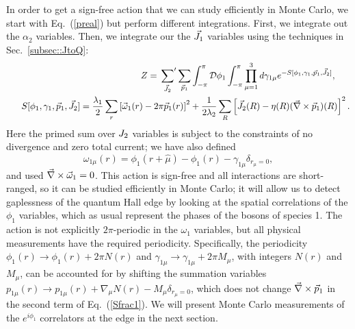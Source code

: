 In order to get a sign-free action that we can study efficiently in Monte Carlo, we start with Eq.~(\ref{preal}) but perform different integrations. 
First, we integrate out the $\alpha_{2}$ variables. Then, we integrate our the $\vec{J}_1$ variables using the techniques in Sec.~\ref{subsec::JtoQ}: 
\begin{eqnarray}
&&Z=\sideset{}{'}\sum_{\vec{J}_2}  \sum_{\vec{p}_1}  \int_{-\pi}^{\pi}  \mathcal{D}\phi_1 \int_{-\pi}^{\pi} \prod_{\mu=1}^{3} d\gamma_{1\mu}
e^{-S[\phi_1,\gamma_1,\vec{p}_1,\vec{J}_2]} , ~~~~~
\label{Zint} \\
&&~~ S[\phi_1,\gamma_1,\vec{p}_1,\vec{J}_2] =
\frac{\lambda_1}{2}\sum_{r} \left[\vec{\omega}_{1}(r)-2\pi \vec{p}_1(r) \right]^2 
+ \frac{1}{2\lambda_2}\sum_R \left[\vec{J}_2(R)-\eta(R)(\vec{\nabla}\times\vec{p}_1)(R) \right]^2.
\label{Sfrac1}
\end{eqnarray}
Here the primed sum over $J_2$ variables is subject to the constraints of no divergence and zero total current; we have also defined
\begin{equation}
\omega_{1\mu}(r)=\phi_1(r+\hat{\mu})-\phi_1(r)-\gamma_{1\mu}\delta_{r_\mu=0},
\label{omega}
\end{equation}
and used $\vec{\nabla}\times\vec{\omega}_1 = 0$.
This action is sign-free and all interactions are short-ranged, so it can be studied efficiently in Monte Carlo; it will allow us to detect gaplessness of the quantum Hall edge by looking at the spatial correlations of the $\phi_1$ variables, which as usual represent the phases of the bosons of species 1. The action is not explicitly $2\pi$-periodic in the $\omega_1$ variables, but all physical measurements have the required periodicity.  Specifically, the periodicity $\phi_1(r) \to \phi_1(r) + 2\pi N(r)$ and $\gamma_{1\mu} \to \gamma_{1\mu} + 2\pi M_\mu$, with integers $N(r)$ and $M_\mu$, can be accounted for by shifting the summation variables $p_{1\mu}(r) \to p_{1\mu}(r) + \nabla_\mu N(r) - M_\mu \delta_{r_\mu = 0}$, which does not change $\vec{\nabla}\times\vec{p}_1$ in the second term of Eq.~(\ref{Sfrac1}). 
We will present Monte Carlo measurements of the $e^{i\phi_1}$ correlators at the edge in the next section.

